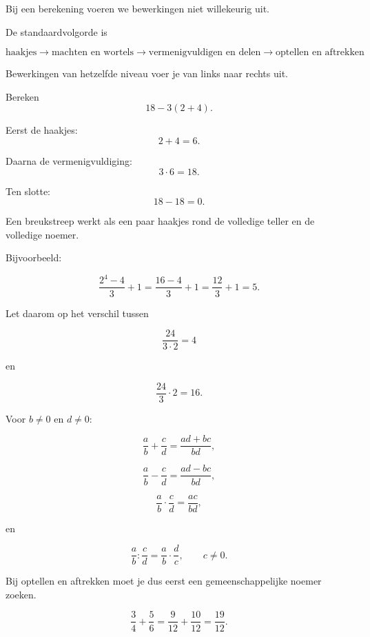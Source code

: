 \documentclass{ximera}
\begin{document}


Bij een berekening voeren we bewerkingen niet willekeurig uit.

De standaardvolgorde is

\[
\boxed{
\text{haakjes}
\rightarrow
\text{machten en wortels}
\rightarrow
\text{vermenigvuldigen en delen}
\rightarrow
\text{optellen en aftrekken}
}
\]

Bewerkingen van hetzelfde niveau voer je van links naar rechts uit.

\begin{voorbeeld}
Bereken
\[
18-3(2+4).
\]

Eerst de haakjes:
\[
2+4=6.
\]

Daarna de vermenigvuldiging:
\[
3\cdot6=18.
\]

Ten slotte:
\[
18-18=0.
\]
\end{voorbeeld}



Een breukstreep werkt als een paar haakjes rond de volledige teller en de volledige noemer.

Bijvoorbeeld:

\[
\frac{2^4-4}{3}+1
=
\frac{16-4}{3}+1
=
\frac{12}{3}+1
=
5.
\]

Let daarom op het verschil tussen

\[
\frac{24}{3\cdot2}=4
\]

en

\[
\frac{24}{3}\cdot2=16.
\]


\begin{eigenschap}
Voor \(b\neq0\) en \(d\neq0\):

\[
\frac ab+\frac cd
=
\frac{ad+bc}{bd},
\]

\[
\frac ab-\frac cd
=
\frac{ad-bc}{bd},
\]

\[
\frac ab\cdot\frac cd
=
\frac{ac}{bd},
\]

en

\[
\frac ab:\frac cd
=
\frac ab\cdot\frac dc,
\qquad c\neq0.
\]
\end{eigenschap}
Bij optellen en aftrekken moet je dus eerst een gemeenschappelijke noemer zoeken.

\begin{voorbeeld}
\[
\frac34+\frac56
=
\frac9{12}+\frac{10}{12}
=
\frac{19}{12}.
\]
\end{voorbeeld}
\end{document}
